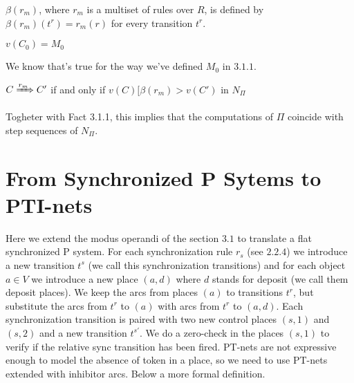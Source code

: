 \begin{definition}
$\beta(r_m)$, where $r_m$ is a multiset of rules over $R$, is defined by 
$\beta(r_m)(t^r)=r_m(r)$ for every transition $t^r$.  
\end{definition}

\begin{fact}[]
$v(C_0)=M_0$
\end{fact}
We know that's true for the way we've defined $M_0$ in \hyperref[def:def_tr_basic]{$3.1.1$}.

\begin{fact}[]
$C \xRightarrow{r_m} C'$ if and only if $v(C)[\beta(r_m)> v(C')$ in $N_\Pi$
\end{fact}

Togheter with Fact 3.1.1, this implies that the computations of $\Pi$ coincide with step sequences of $N_\Pi$. 

\section{From Synchronized P Sytems to PTI-nets}

Here we extend the modus operandi of the section \hyperref[sec:basic_p_to_pt]{$3.1$} to translate 
a flat synchronized P system.
For each synchronization rule $r_s$ (see \hyperref[def:sync_rule]{$2.2.4$}) we introduce a new transition $t^s$ (we call this synchronization transitions) and for each object $a \in V$ we introduce a new place $(a,d)$ where $d$ stands for deposit (we call them deposit places).
We keep the arcs from places $(a)$ to transitions $t^r$, but substitute the arcs from $t^r$ to $(a)$ with arcs from $t^r$ to $(a,d)$.
Each synchronization transition is paired with two new control places $(s,1)$ and $(s,2)$ and a new transition $t^{s\prime}$.
We do a zero-check in the places $(s,1)$ to verify if the relative sync transition has been fired.
PT-nets are not expressive enough to model the absence of token in a place, so we need to use PT-nets extended with inhibitor arcs.
Below a more formal definition.

